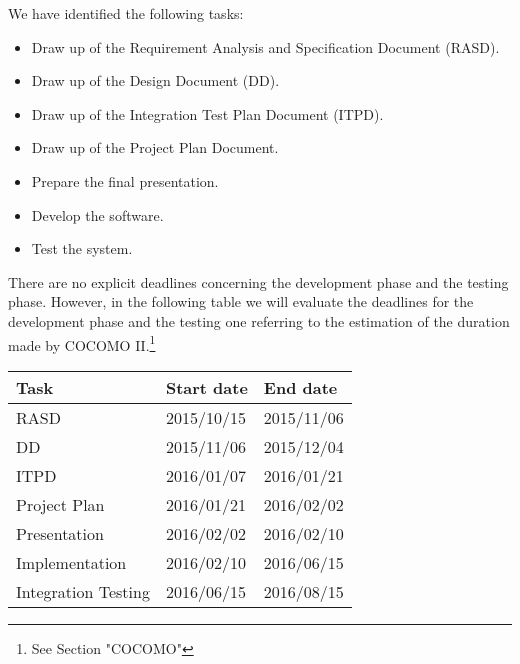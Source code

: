 We have identified the following tasks:
\begin{itemize}
    \item Draw up of the Requirement Analysis and Specification Document (RASD).
    \item Draw up of the Design Document (DD).
    \item Draw up of the Integration Test Plan Document (ITPD).
    \item Draw up of the Project Plan Document.
    \item Prepare the final presentation.
    \item Develop the software.
    \item Test the system.
\end{itemize}

There are no explicit deadlines concerning the development phase and the testing phase. However, in the following table we will evaluate the deadlines for the development phase and the testing one referring to the estimation of the duration made by COCOMO II.\footnote{See Section "COCOMO"}
\newline
\begin{table}[H]
    \centering
    \begin{tabular}{|l|l|l|}
        \hline
        \textbf{Task} & \textbf{Start date} & \textbf{End date}\\
        \hline
        RASD & 2015/10/15 & 2015/11/06\\
        \hline
        DD & 2015/11/06 & 2015/12/04\\
        \hline
        ITPD & 2016/01/07 & 2016/01/21\\
        \hline
        Project Plan & 2016/01/21 & 2016/02/02\\
        \hline
        Presentation & 2016/02/02 & 2016/02/10\\
        \hline
        Implementation & 2016/02/10 & 2016/06/15 \\
        \hline
        Integration Testing & 2016/06/15 & 2016/08/15\\
        \hline
    \end{tabular}
\end{table}